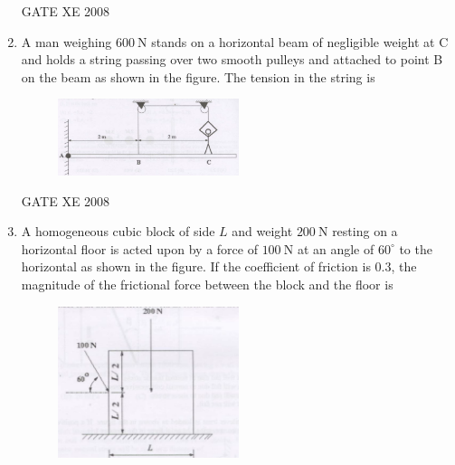 \documentclass[12pt]{article}
\begin{document}
\begin{enumerate}[label=Q\arabic*.]
\begin{enumerate}[label=(\Alph*)]
\end{enumerate}
    
    GATE XE 2008


    \item A man weighing $600 \ \mathrm{N}$ stands on a horizontal beam of negligible weight at C and holds a string passing over two smooth pulleys and attached to point B on the beam as shown in the figure. The tension in the string is

    \begin{figure}[H]
    \centering
    \includegraphics[width=0.5\textwidth]{figs/ass1_f_q17.png}
    \caption{}
    \end{figure}

\begin{enumerate}[label=(\Alph*)]
\end{enumerate}

    GATE XE 2008

    \item A homogeneous cubic block of side $L$ and weight $200 \ \mathrm{N}$ resting on a horizontal floor is acted upon by a force of $100 \ \mathrm{N}$ at an angle of $60^{\circ}$ to the horizontal as shown in the figure. If the coefficient of friction is $0.3$, the magnitude of the frictional force between the block and the floor is

    \begin{figure}[H]
    \centering
    \includegraphics[width=0.5\textwidth]{figs/ass1_f_q18.png}
    \caption{}
    \end{figure}


\end{enumerate}
\end{document}
